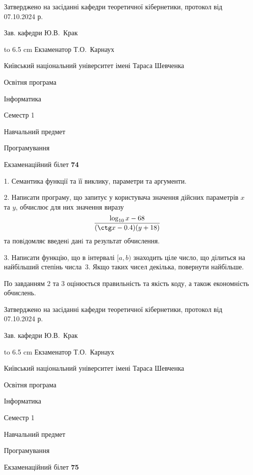\documentclass[12pt, ukrainian]{article}
\begin{document}
{\smallskip\smallskip \begin {scriptsize} Затверджено на засіданні кафедри теоретичної кібернетики, протокол   від   07.10.2024 р.\par\smallskip\smallskip\smallskip\smallskip
{\parbox {6.5 cm} {Зав. кафедри \dotfill Ю.В.~Крак}}\hspace {0.7cm} {\hbox to 6.5 cm { Екзаменатор \dotfill Т.О.~Карнаух}} \end{scriptsize}}
\vspace{0.9cm}
{{\begin {scriptsize}\par
{ \center  Київський національний університет імені Тараса Шевченка \par}
{\parbox {5 cm}{Освітня програма \hfill}{\parbox {7 cm}{Інформатика\hfill}}\parbox {6 cm}{\hfill Семестр 1}}\par
{\parbox {5 cm} {Навчальний предмет \hfill}\parbox {7 cm}{Програмування \hfill}\parbox {6cm}{\hfill}\par}\vspace{-15pt} \end{scriptsize}}{\center Екзаменаційний білет \No \textbf { 74 }\par}}
{%
1. Семантика функції та її виклику, параметри та аргументи.%
\par
2. Написати програму, що запитує у користувача значення дійсних параметрів $x$ та $y$, обчислює для них значення виразу 
$$\frac{\log_{10} x - 68}{(\ctg x - 0.4) (y + 18)}$$ 
та повiдомляє введенi данi та результат обчислення.

\par
3. Написати функцію, що в інтервалі $[a, b)$ знаходить ціле число, що ділиться на найбільший степінь числа 3. Якщо таких чисел декілька, повернути найбільше.

По завданням 2 та 3 оцінюється правильність та якість коду, а також економність обчислень.

}
{\smallskip\smallskip \begin {scriptsize} Затверджено на засіданні кафедри теоретичної кібернетики, протокол   від   07.10.2024 р.\par\smallskip\smallskip\smallskip\smallskip
{\parbox {6.5 cm} {Зав. кафедри \dotfill Ю.В.~Крак}}\hspace {0.7cm} {\hbox to 6.5 cm { Екзаменатор \dotfill Т.О.~Карнаух}} \end{scriptsize}}
\vspace{0.9cm}
{{\begin {scriptsize}\par
{ \center  Київський національний університет імені Тараса Шевченка \par}
{\parbox {5 cm}{Освітня програма \hfill}{\parbox {7 cm}{Інформатика\hfill}}\parbox {6 cm}{\hfill Семестр 1}}\par
{\parbox {5 cm} {Навчальний предмет \hfill}\parbox {7 cm}{Програмування \hfill}\parbox {6cm}{\hfill}\par}\vspace{-15pt} \end{scriptsize}}{\center Екзаменаційний білет \No \textbf { 75 }\par}}
\end{document}
